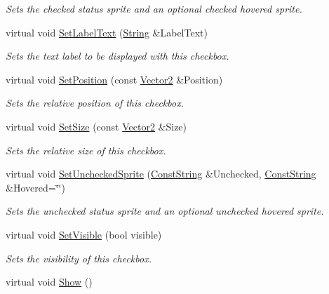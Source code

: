 \begin{DoxyCompactItemize}
\begin{DoxyCompactList}\small\item\em Sets the checked status sprite and an optional checked hovered sprite. \item\end{DoxyCompactList}\item 
virtual void \hyperlink{classphys_1_1UI_1_1CheckBox_aa25bc0f39dca43c00585d107e9a3bcb7}{SetLabelText} (\hyperlink{namespacephys_aa03900411993de7fbfec4789bc1d392e}{String} \&LabelText)
\begin{DoxyCompactList}\small\item\em Sets the text label to be displayed with this checkbox. \item\end{DoxyCompactList}\item 
virtual void \hyperlink{classphys_1_1UI_1_1CheckBox_ae0a000643e0f96f12d754a8e1e5dd04b}{SetPosition} (const \hyperlink{classphys_1_1Vector2}{Vector2} \&Position)
\begin{DoxyCompactList}\small\item\em Sets the relative position of this checkbox. \item\end{DoxyCompactList}\item 
virtual void \hyperlink{classphys_1_1UI_1_1CheckBox_a3cacea11779470e31efb6020c22e0c54}{SetSize} (const \hyperlink{classphys_1_1Vector2}{Vector2} \&Size)
\begin{DoxyCompactList}\small\item\em Sets the relative size of this checkbox. \item\end{DoxyCompactList}\item 
virtual void \hyperlink{classphys_1_1UI_1_1CheckBox_ab4b6304f4203a244dea48185eff81f43}{SetUncheckedSprite} (\hyperlink{namespacephys_a5ce5049f8b4bf88d6413c47b504ebb31}{ConstString} \&Unchecked, \hyperlink{namespacephys_a5ce5049f8b4bf88d6413c47b504ebb31}{ConstString} \&Hovered=\char`\"{}\char`\"{})
\begin{DoxyCompactList}\small\item\em Sets the unchecked status sprite and an optional unchecked hovered sprite. \item\end{DoxyCompactList}\item 
virtual void \hyperlink{classphys_1_1UI_1_1CheckBox_aac2babdb951a7b716b5cfff9b925420f}{SetVisible} (bool visible)
\begin{DoxyCompactList}\small\item\em Sets the visibility of this checkbox. \item\end{DoxyCompactList}\item 
\hypertarget{classphys_1_1UI_1_1CheckBox_afceb8a1afac295be23227462e6cbc369}{
virtual void \hyperlink{classphys_1_1UI_1_1CheckBox_afceb8a1afac295be23227462e6cbc369}{Show} ()}
\label{classphys_1_1UI_1_1CheckBox_afceb8a1afac295be23227462e6cbc369}


\end{DoxyCompactItemize}
